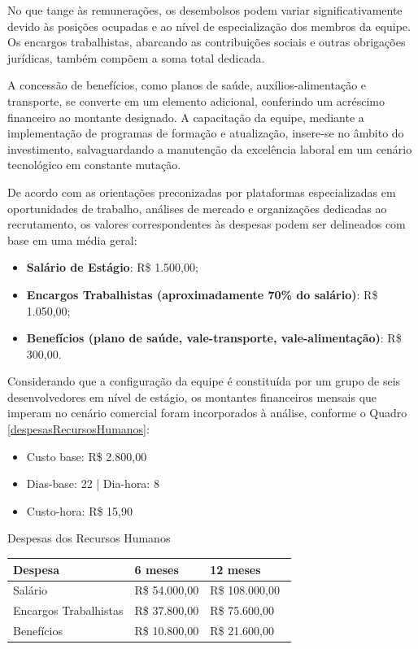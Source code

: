 No que tange às remunerações, os desembolsos podem variar significativamente devido às posições ocupadas e ao nível de especialização dos membros da equipe. Os encargos trabalhistas, abarcando as contribuições sociais e outras obrigações jurídicas, também compõem a soma total dedicada.

A concessão de benefícios, como planos de saúde, auxílios-alimentação e transporte, se converte em um elemento adicional, conferindo um acréscimo financeiro ao montante designado. A capacitação da equipe, mediante a implementação de programas de formação e atualização, insere-se no âmbito do investimento, salvaguardando a manutenção da excelência laboral em um cenário tecnológico em constante mutação.

De acordo com as orientações preconizadas por plataformas especializadas em oportunidades de trabalho, análises de mercado e organizações dedicadas ao recrutamento, os valores correspondentes às despesas podem ser delineados com base em uma média geral:

\begin{itemize}
    \item \textbf{Salário de Estágio}: R\$ 1.500,00;
    \item \textbf{Encargos Trabalhistas (aproximadamente 70\% do salário)}: R\$ 1.050,00;
    \item \textbf{Benefícios (plano de saúde, vale-transporte, vale-alimentação)}: R\$ 300,00.
\end{itemize}

Considerando que a configuração da equipe é constituída por um grupo de seis desenvolvedores em nível de estágio, os montantes financeiros mensais que imperam no cenário comercial foram incorporados à análise, conforme o Quadro \ref{despesasRecursosHumanos}:

\begin{itemize}
    \item Custo base: R\$ 2.800,00
    \item Dias-base: 22 | Dia-hora: 8
    \item Custo-hora: R\$ 15,90
\end{itemize}

\begin{quadro}[H]
\centering
\caption{Despesas dos Recursos Humanos}
\label{despesasRecursosHumanos}
\begin{longtable}{|p{5cm}|p{3cm}|p{3cm}|}
\hline
Despesa & 6 meses & 12 meses
\\\hline
Salário & R\$ 54.000,00 & R\$ 108.000,00\
\\\hline
Encargos Trabalhistas & R\$ 37.800,00 & R\$ 75.600,00\
\\\hline
Benefícios & R\$ 10.800,00 & R\$ 21.600,00\
\\\hline
\end{longtable}
\fonte{Os Autores.}
\end{quadro}

